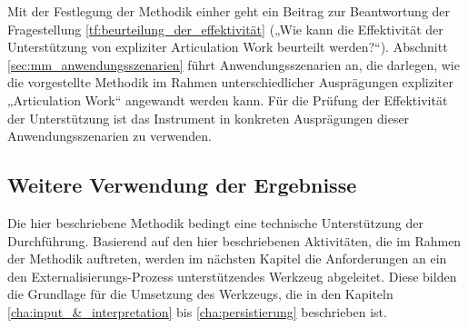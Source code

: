 Mit der Festlegung der Methodik einher geht ein Beitrag zur Beantwortung der Fragestellung \ref{tf:beurteilung_der_effektivität} („Wie kann die Effektivität der Unterstützung von expliziter Articulation Work beurteilt werden?“). Abschnitt \ref{sec:mm_anwendungsszenarien} führt Anwendungsszenarien an, die darlegen, wie die vorgestellte Methodik im Rahmen unterschiedlicher Ausprägungen expliziter „Articulation Work“ angewandt werden kann. Für die Prüfung der Effektivität der Unterstützung ist das Instrument in konkreten Ausprägungen dieser Anwendungsszenarien zu verwenden. 

\subsection{Weitere Verwendung der Ergebnisse}

Die hier beschriebene Methodik bedingt eine technische Unterstützung der Durchführung. Basierend auf den hier beschriebenen Aktivitäten, die im Rahmen der Methodik auftreten, werden im nächsten Kapitel die Anforderungen an ein den Externalisierungs-Prozess unterstützendes Werkzeug abgeleitet. Diese bilden die Grundlage für die Umsetzung des Werkzeugs, die in den Kapiteln \ref{cha:input_&_interpretation} bis \ref{cha:persistierung} beschrieben ist. 


%

